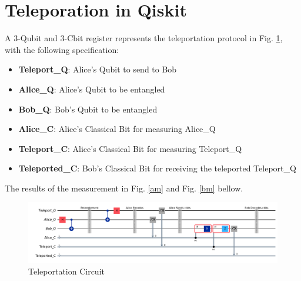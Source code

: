 \section*{Teleporation in Qiskit}

A 3-Qubit and 3-Cbit register represents the teleportation protocol in Fig. \ref{tc}, with the following specification:

\begin{itemize}
    \item \textbf{Teleport\_Q}: Alice's Qubit to send to Bob
    \item \textbf{Alice\_Q}: Alice's Qubit to be entangled
    \item \textbf{Bob\_Q}: Bob's Qubit to be entangled
    \item \textbf{Alice\_C}: Alice's Classical Bit for measuring Alice\_Q
    \item \textbf{Teleport\_C}: Alice's Classical Bit for measuring Teleport\_Q
    \item \textbf{Teleported\_C}: Bob's Classical Bit for receiving the teleported Teleport\_Q
\end{itemize}
\vspace{1cm} %

The results of the measurement in Fig. \ref{am} and Fig. \ref{bm} bellow.


\begin{figure}[h!]
    \centering
    \caption{Teleportation Circuit}
    \label{tc}
    \begin{minipage}{1\textwidth}
        \centering
        \includegraphics[width=\linewidth]{exercise3/aer_simulator__circuit.png}
    \end{minipage}
\end{figure}

